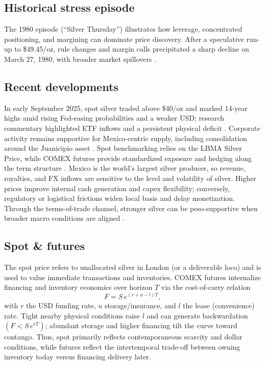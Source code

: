 \documentclass[11pt,a4paper]{article} %
\begin{document}
\subsection{Historical stress episode}
The 1980 episode (“Silver Thursday”) illustrates how leverage, concentrated positioning, and margining can dominate price discovery. After a speculative run-up to \$49.45/oz, rule changes and margin calls precipitated a sharp decline on March 27, 1980, with broader market spillovers \citep{britannica_silver_thursday,nyt_1980_silver_thursday}.

\subsection{Recent developments}
In early September 2025, spot silver traded above \$40/oz and marked 14-year highs amid rising Fed-easing probabilities and a weaker USD; research commentary highlighted ETF inflows and a persistent physical deficit \citep{reuters_silver_14y_sep1,reuters_tradingday_sep11,reuters_anz_raises_silver,lbma_q2_2025}. Corporate activity remains supportive for Mexico-centric supply, including consolidation around the Juanicipio asset \citep{reuters_paasmag}. Spot benchmarking relies on the LBMA Silver Price, while COMEX futures provide standardized exposure and hedging along the term structure \citep{lbma_prices,cme_silver_overview}. 
Mexico is the world's largest silver producer, so revenue, royalties, and FX inflows are sensitive to the level and volatility of silver. Higher prices improve internal cash generation and capex flexibility; conversely, regulatory or logistical frictions widen local basis and delay monetization. Through the terms-of-trade channel, stronger silver can be peso-supportive when broader macro conditions are aligned \citep{reuters_mx_top_silver}.

\subsection{Spot \& futures}
The spot price refers to unallocated silver in London (or a deliverable loco) and is used to value immediate transactions and inventories. COMEX futures internalize financing and inventory economics over horizon \(T\) via the cost-of-carry relation
\[
F=S\,e^{(r+u-l)T},
\]
with \(r\) the USD funding rate, \(u\) storage/insurance, and \(l\) the lease (convenience) rate. Tight nearby physical conditions raise \(l\) and can generate backwardation \((F<S\,e^{rT})\); abundant storage and higher financing tilt the curve toward contango. Thus, spot primarily reflects contemporaneous scarcity and dollar conditions, while futures reflect the intertemporal trade-off between owning inventory today versus financing delivery later.
\end{document}

